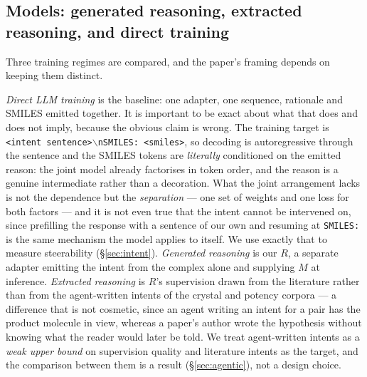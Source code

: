 \subsection{Models: generated reasoning, extracted reasoning, and direct training}

Three training regimes are compared, and the paper's framing depends on keeping them distinct.

\emph{Direct LLM training} is the baseline: one adapter, one sequence, rationale and SMILES emitted
together. It is important to be exact about what that does and does not imply, because the obvious
claim is wrong. The training target is \texttt{<intent sentence>$\backslash$nSMILES: <smiles>}, so
decoding is autoregressive through the sentence and the SMILES tokens are \emph{literally}
conditioned on the emitted reason: the joint model already factorises in token order, and the reason
is a genuine intermediate rather than a decoration. What the joint arrangement lacks is not the
dependence but the \emph{separation} --- one set of weights and one loss for both factors --- and it
is not even true that the intent cannot be intervened on, since prefilling the response with a
sentence of our own and resuming at \texttt{SMILES:} is the same mechanism the model applies to
itself. We use exactly that to measure steerability (\S\ref{sec:intent}). \emph{Generated reasoning} is our $R$, a separate
adapter emitting the intent from the complex alone and supplying $M$ at inference.
\emph{Extracted reasoning} is $R$'s supervision drawn from the literature rather than from the
agent-written intents of the crystal and potency corpora --- a difference that is not cosmetic, since
an agent writing an intent for a pair has the product molecule in view, whereas a paper's author
wrote the hypothesis without knowing what the reader would later be told. We treat agent-written intents as a \emph{weak upper bound} on supervision
quality and literature intents as the target, and the comparison between them is a result
(\S\ref{sec:agentic}), not a design choice.

